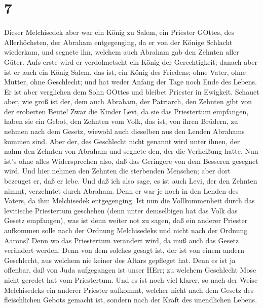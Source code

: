 \hypertarget{section-5}{%
\section{7}\label{section-5}}

 Dieser Melchisedek aber war ein König zu Salem, ein
Priester GOttes, des Allerhöchsten, der Abraham entgegenging, da er von
der Könige Schlacht wiederkam, und segnete ihn,  welchem
auch Abraham gab den Zehnten aller Güter. Aufs erste wird er
verdolmetscht ein König der Gerechtigkeit; danach aber ist er auch ein
König Salem, das ist, ein König des Friedens;  ohne Vater,
ohne Mutter, ohne Geschlecht; und hat weder Anfang der Tage noch Ende
des Lebens. Er ist aber verglichen dem Sohn GOttes und bleibet Priester
in Ewigkeit.  Schauet aber, wie groß ist der, dem auch
Abraham, der Patriarch, den Zehnten gibt von der eroberten Beute!
 Zwar die Kinder Levi, da sie das Priestertum empfangen,
haben sie ein Gebot, den Zehnten vom Volk, das ist, von ihren Brüdern,
zu nehmen nach dem Gesetz, wiewohl auch dieselben aus den Lenden
Abrahams kommen sind.  Aber der, des Geschlecht nicht
genannt wird unter ihnen, der nahm den Zehnten von Abraham und segnete
den, der die Verheißung hatte.  Nun ist's ohne alles
Widersprechen also, daß das Geringere von dem Besseren gesegnet wird.
 Und hier nehmen den Zehnten die sterbenden Menschen; aber
dort bezeuget er, daß er lebe.  Und daß ich also sage, es
ist auch Levi, der den Zehnten nimmt, verzehntet durch Abraham.
 Denn er war je noch in den Lenden des Vaters, da ihm
Melchisedek entgegenging.  Ist nun die Vollkommenheit durch
das levitische Priestertum geschehen (denn unter demselbigen hat das
Volk das Gesetz empfangen), was ist denn weiter not zu sagen, daß ein
anderer Priester aufkommen solle nach der Ordnung Melchisedeks und nicht
nach der Ordnung Aarons?  Denn wo das Priestertum verändert
wird, da muß auch das Gesetz verändert werden.  Denn von
dem solches gesagt ist, der ist von einem andern Geschlecht, aus welchem
nie keiner des Altars gepfleget hat.  Denn es ist ja
offenbar, daß von Juda aufgegangen ist unser HErr; zu welchem Geschlecht
Mose nicht geredet hat vom Priestertum.  Und es ist noch
viel klarer, so nach der Weise Melchisedeks ein anderer Priester
aufkommt,  welcher nicht nach dem Gesetz des fleischlichen
Gebots gemacht ist, sondern nach der Kraft des unendlichen Lebens.
